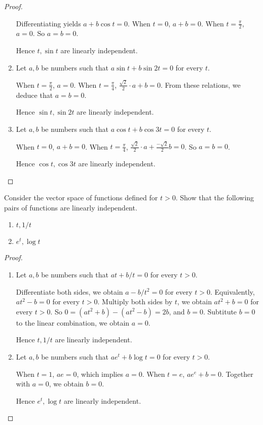 \begin{proof}
\begin{enumerate}[label={(\alph*)}]
              Differentiating yields $a + b\cos t = 0$. When $t = 0$, $a + b = 0$. When $t = \frac{\pi}{2}$, $a = 0$. So $a = b = 0$.

              Hence $t, \sin t$ are linearly independent.
        \item Let $a, b$ be numbers such that $a\sin t + b\sin 2t = 0$ for every $t$.

              When $t = \frac{\pi}{2}$, $a = 0$. When $t = \frac{\pi}{4}$, $\frac{\sqrt{2}}{2}\cdot a + b = 0$. From these relations, we deduce that $a = b = 0$.

              Hence $\sin t, \sin 2t$ are linearly independent.
        \item Let $a, b$ be numbers such that $a\cos t + b\cos 3t = 0$ for every $t$.

              When $t = 0$, $a + b = 0$. When $t = \frac{\pi}{4}$, $\frac{\sqrt{2}}{2}\cdot a + \frac{-\sqrt{2}}{2}b = 0$. So $a = b = 0$.

              Hence $\cos t, \cos 3t$ are linearly independent.
    \end{enumerate}
\end{proof}

\begin{exercise}
    Consider the vector space of functions defined for $t > 0$. Show that the following pairs of functions are linearly independent.
    \begin{enumerate}[label={(\alph*)},itemsep=0pt]
        \item $t, 1/t$
        \item $e^{t}, \log t$
    \end{enumerate}
\end{exercise}

\begin{proof}
    \begin{enumerate}[label={(\alph*)},itemsep=0pt]
        \item Let $a, b$ be numbers such that $at + b/t = 0$ for every $t > 0$.

              Differentiate both sides, we obtain $a - b/t^{2} = 0$ for every $t > 0$. Equivalently, $a{t}^{2} - b = 0$ for every $t > 0$. Multiply both sides by $t$, we obtain  $at^{2} + b = 0$ for every $t > 0$. So $0 = (at^{2} + b) - (at^{2} - b) = 2b$, and $b = 0$. Subtitute $b = 0$ to the linear combination, we obtain $a = 0$.

              Hence $t, 1/t$ are linearly independent.
        \item Let $a, b$ be numbers such that $a{e}^{t} + b\log t = 0$ for every $t > 0$.

              When $t = 1$, $ae = 0$, which implies $a = 0$. When $t = e$, $a{e}^{e} + b = 0$. Together with $a = 0$, we obtain $b = 0$.

              Hence $e^{t}, \log t$ are linearly independent.
    \end{enumerate}
\end{proof}

